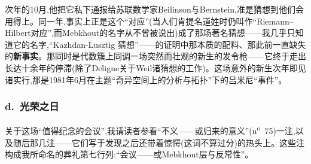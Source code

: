 次年的10月,他把它私下通报给苏联数学家Beilinson与Bernstein,准是猜想到他们会用得上。同一年,事实上正是这个“对应”(当人们肯提名道姓时仍叫作“Riemann--Hilbert对应”,而Mebkhout的名字从不曾被说出)成了那场著名猜想——我几乎只知道它的名字,“Kazhdan-Lusztig 猜想”——的证明中那本质的配料、那此前一直缺失的\textbf{新事实}。那同时是代数簇上同调一场突然而壮观的新生的发令枪——它终于走出长达十余年的停滞(除了Deligne关于Weil诸猜想的工作)。这场意外的新生次年即见诸实行,那是1981年6月在主题“奇异空间上的分析与拓扑”下的吕米尼“事件”。



\subsubsection*{d.~光荣之日}



关于这场“值得纪念的会议”,我请读者参看“不义——或归来的意义”(n\textsuperscript{o}~75)一注,以及随后那几注——它们写于发现之后还带着惊愕(这词不算过分)的热头上。这些注构成我所命名的葬礼第七行列:“会议——或Mebkhout层与反常性”。

